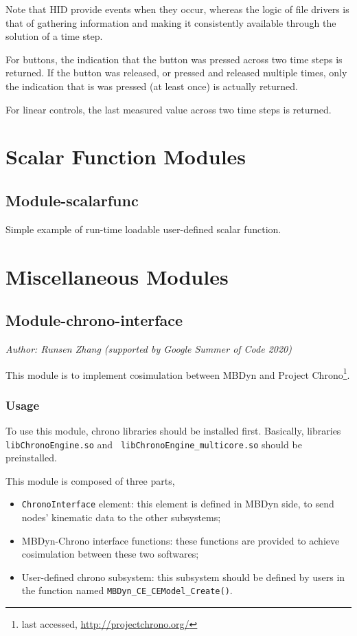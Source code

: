 Note that HID provide events when they occur, whereas the logic of file drivers
is that of gathering information and making it consistently available through
the solution of a time step.

For buttons, the indication that the button was pressed across two time steps is returned.
If the button was released, or pressed and released multiple times,
only the indication that is was pressed (at least once) is actually returned.

For linear controls, the last measured value across two time steps is returned.





\section{Scalar Function Modules}

\subsection{Module-scalarfunc}
Simple example of run-time loadable user-defined scalar function.



\section{Miscellaneous Modules}

\subsection{Module-chrono-interface}
\emph{Author: Runsen Zhang (supported by Google Summer of Code 2020)}

\noindent
This module is to implement cosimulation between MBDyn and Project Chrono\footnote{last accessed, \url{http://projectchrono.org/}}. 

\bigskip

\subsubsection{Usage}
\noindent
To use this module, chrono libraries should be installed first. Basically, libraries {\texttt{libChronoEngine.so}} and {\texttt{ libChronoEngine\_multicore.so}} should be preinstalled. 

\noindent
This module is composed of three parts, 
\begin{itemize}
\item {\texttt{ChronoInterface}} element: this element is defined in MBDyn side, to send nodes' kinematic data to the other subsystems;
\item MBDyn-Chrono interface functions: these functions are provided to achieve cosimulation between these two softwares;
\item User-defined chrono subsystem: this subsystem should be defined by users in the function named {\texttt{MBDyn\_CE\_CEModel\_Create()}}.
\end{itemize}

